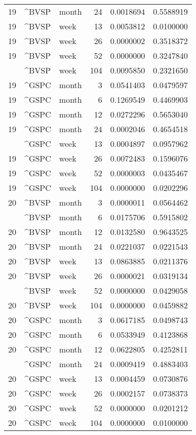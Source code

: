 \begin{tabular}{rllrrr}
19 & \textasciicircum{}BVSP & month & 24 & 0.0018694 & 0.5588919\\
19 & \textasciicircum{}BVSP & week & 13 & 0.0053812 & 0.0100000\\
19 & \textasciicircum{}BVSP & week & 26 & 0.0000002 & 0.3518372\\
19 & \textasciicircum{}BVSP & week & 52 & 0.0000000 & 0.3247840\\
\addlinespace
19 & \textasciicircum{}BVSP & week & 104 & 0.0095850 & 0.2321650\\
19 & \textasciicircum{}GSPC & month & 3 & 0.0541403 & 0.0479597\\
19 & \textasciicircum{}GSPC & month & 6 & 0.1269549 & 0.4469903\\
19 & \textasciicircum{}GSPC & month & 12 & 0.0272296 & 0.5653040\\
19 & \textasciicircum{}GSPC & month & 24 & 0.0002046 & 0.4654518\\
\addlinespace
19 & \textasciicircum{}GSPC & week & 13 & 0.0004897 & 0.0957962\\
19 & \textasciicircum{}GSPC & week & 26 & 0.0072483 & 0.1596076\\
19 & \textasciicircum{}GSPC & week & 52 & 0.0000003 & 0.0435467\\
19 & \textasciicircum{}GSPC & week & 104 & 0.0000000 & 0.0202296\\
20 & \textasciicircum{}BVSP & month & 3 & 0.0000011 & 0.0564462\\
\addlinespace
20 & \textasciicircum{}BVSP & month & 6 & 0.0175706 & 0.5915802\\
20 & \textasciicircum{}BVSP & month & 12 & 0.0132580 & 0.9643525\\
20 & \textasciicircum{}BVSP & month & 24 & 0.0221037 & 0.0221543\\
20 & \textasciicircum{}BVSP & week & 13 & 0.0863885 & 0.0211376\\
20 & \textasciicircum{}BVSP & week & 26 & 0.0000021 & 0.0319134\\
\addlinespace
20 & \textasciicircum{}BVSP & week & 52 & 0.0000000 & 0.0429058\\
20 & \textasciicircum{}BVSP & week & 104 & 0.0000000 & 0.0459882\\
20 & \textasciicircum{}GSPC & month & 3 & 0.0617185 & 0.0498743\\
20 & \textasciicircum{}GSPC & month & 6 & 0.0533949 & 0.4123868\\
20 & \textasciicircum{}GSPC & month & 12 & 0.0622805 & 0.4252811\\
\addlinespace
20 & \textasciicircum{}GSPC & month & 24 & 0.0009419 & 0.4883403\\
20 & \textasciicircum{}GSPC & week & 13 & 0.0004459 & 0.0730876\\
20 & \textasciicircum{}GSPC & week & 26 & 0.0002157 & 0.0738373\\
20 & \textasciicircum{}GSPC & week & 52 & 0.0000000 & 0.0201212\\
20 & \textasciicircum{}GSPC & week & 104 & 0.0000000 & 0.0100000\\
\bottomrule
\end{tabular}
